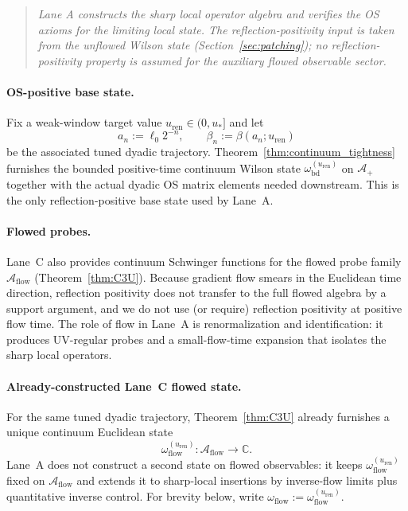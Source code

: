 \begin{quote}
\emph{Lane A constructs the sharp local operator algebra and verifies the OS axioms for the limiting local state.
The reflection-positivity input is taken from the unflowed Wilson state (Section~\ref{sec:patching});
no reflection-positivity property is assumed for the auxiliary flowed observable sector.}
\end{quote}

\paragraph{OS-positive base state.}
Fix a weak-window target value $u_{\mathrm{ren}}\in(0,u_\ast]$ and let
\[
a_n:=\ell_0 2^{-n},\qquad \beta_n:=\beta(a_n;u_{\mathrm{ren}})
\]
be the associated tuned dyadic trajectory.
Theorem~\ref{thm:continuum_tightness} furnishes the bounded positive-time continuum Wilson state $\omega_{\mathrm{bd}}^{(u_{\mathrm{ren}})}$ on $\mathcal A_+$ together with the actual dyadic OS matrix elements needed downstream.
This is the only reflection-positive base state used by Lane~A.

\paragraph{Flowed probes.}
Lane~C also provides continuum Schwinger functions for the flowed probe family $\mathcal A_{\mathrm{flow}}$ (Theorem~\ref{thm:C3U}).
Because gradient flow smears in the Euclidean time direction, reflection positivity does not transfer to the full flowed algebra by a support argument,
and we do not use (or require) reflection positivity at positive flow time.
The role of flow in Lane~A is renormalization and identification: it produces UV-regular probes and a small-flow-time expansion that
isolates the sharp local operators.

\paragraph{Already-constructed Lane~C flowed state.}
For the same tuned dyadic trajectory, Theorem~\ref{thm:C3U} already furnishes a unique continuum Euclidean state
\[
\omega_{\mathrm{flow}}^{(u_{\mathrm{ren}})}:\mathcal A_{\mathrm{flow}}\to\mathbb C.
\]
Lane~A does not construct a second state on flowed observables: it keeps $\omega_{\mathrm{flow}}^{(u_{\mathrm{ren}})}$ fixed on $\mathcal A_{\mathrm{flow}}$ and extends it to sharp-local insertions by inverse-flow limits plus quantitative inverse control.
For brevity below, write $\omega_{\mathrm{flow}}:=\omega_{\mathrm{flow}}^{(u_{\mathrm{ren}})}$.

